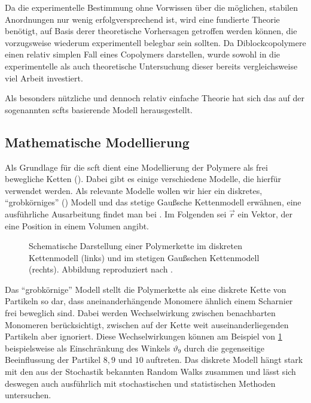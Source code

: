 Da die experimentelle Bestimmung ohne Vorwissen über die möglichen, stabilen Anordnungen nur wenig erfolgversprechend ist, wird eine fundierte Theorie benötigt, auf Basis derer theoretische Vorhersagen getroffen werden können, die vorzugsweise wiederum experimentell belegbar sein sollten.
Da Diblockcopolymere einen relativ simplen Fall eines Copolymers darstellen, wurde sowohl in die experimentelle als auch theoretische Untersuchung dieser bereits vergleichsweise viel Arbeit investiert.

Als besonders nützliche und dennoch relativ einfache Theorie hat sich das auf der sogenannten \acp{scft} basierende Modell herausgestellt.

\subsection*{Mathematische Modellierung} %

Als Grundlage für die \acl{scft} dient eine Modellierung der Polymere als frei bewegliche Ketten ().
Dabei gibt es einige verschiedene Modelle, die hierfür verwendet werden.
Als relevante Modelle wollen wir hier ein diskretes, \enquote{grobkörniges} () Modell und das stetige Gaußsche Kettenmodell erwähnen, eine ausführliche Ausarbeitung findet man bei \textcites[Chapter 2]{Fredrickson:2006th}{rubinstein2003polymer}.
Im Folgenden sei $\vec{r}$ ein Vektor, der eine Position in einem Volumen angibt.

\begin{figure}[tb]
    \centering
        
    \caption[%
        Polymerkette in diskretem und Gaußschen Kettenmodell
    ]{%
        Schematische Darstellung einer Polymerkette im diskreten Kettenmodell (links) und im stetigen Gaußschen Kettenmodell (rechts).
        Abbildung reproduziert nach \cite[Figure 2.1 und 2.5]{Fredrickson:2006th}.
    }
    \label{fig:el:kettenmodelle}
\end{figure}

Das \enquote{grobkörnige} Modell stellt die Polymerkette als eine diskrete Kette von Partikeln so dar, dass aneinanderhängende Monomere ähnlich einem Scharnier frei beweglich sind.
Dabei werden Wechselwirkung zwischen benachbarten Monomeren berücksichtigt, zwischen auf der Kette weit auseinanderliegenden Partikeln aber ignoriert.
Diese Wechselwirkungen können am Beispiel von \cref{fig:el:kettenmodelle} beispielsweise als Einschränkung des Winkels $\vartheta_9$ durch die gegenseitige Beeinflussung der Partikel $8, 9$ und $10$ auftreten.
Das diskrete Modell hängt stark mit den aus der Stochastik bekannten Random Walks zusammen und lässt sich deswegen auch ausführlich mit stochastischen und statistischen Methoden untersuchen.

